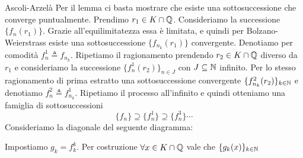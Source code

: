 \documentclass[a4paper]{article}
\begin{document}
\begin{snippetproof}{Ascoli-Arzelà}
    Per il lemma ci basta mostrare che esiste una sottosuccessione
    che converge puntualmente.
    Prendimo \(r_1 \in K \cap \mathbb{Q}\).
    Consideriamo la successione \(\{f_n(r_1)\}\).
    Grazie all'equilimitatezza essa è limitata, e quindi per
    Bolzano-Weierstrass esiste una sottosuccessione \(\{f_{n_k}(r_1)\}\)
    convergente. Denotiamo per comodità \(f^1_n \triangleq f_{n_k}\).
    Ripetiamo il ragionamento prendendo \(r_2 \in K \cap \mathbb{Q}\)
    diverso da \(r_1\) e consideriamo la successione \(\{f^1_n(r_2)\}_{n \in J}\)
    con \(J \subseteq \mathbb{N}\) infinito.
    Per lo stesso ragionamento di prima estratto una sottosuccessione convergente
    \(\{f^2_{n_k}(r_2)\}_{k\in\mathbb{N}}\) e denotiamo \(f^2_n \triangleq f^1_{n_k}\).
    Ripetiamo il processo all'infinito e quindi otteniamo una famiglia di sottosuccessioni
    \[
        \{f_n\} \supseteq \{f_n^1\} \supseteq \{f_n^3\} \cdots
    \]
    Consideriamo la diagonale del seguente diagramma:
    \begin{center}
    \end{center}
    Impostiamo
    \(g_k = f_k^k\).
    Per costruzione \(\forall x \in K \cap \mathbb{Q}\)
    vale che \(\{g_k(x)\}_{k \in \mathbb{N}}\)

\end{snippetproof}
\end{document}
